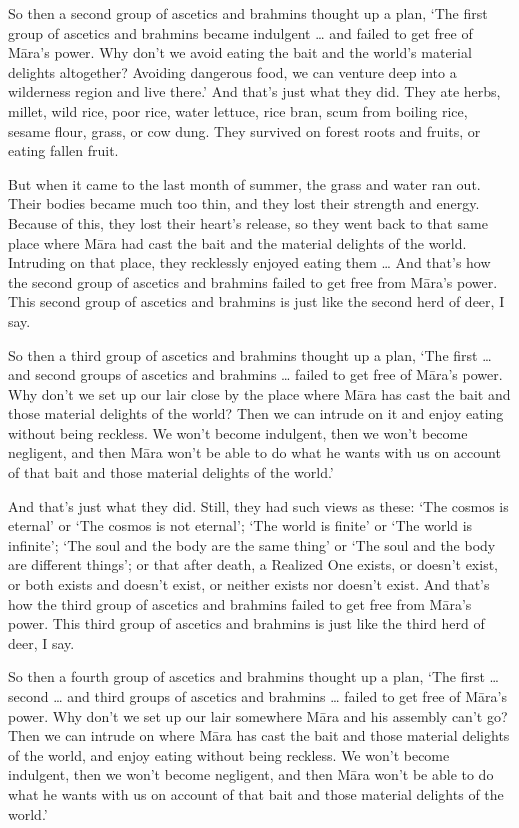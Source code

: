 \documentclass[12pt,openany]{book}%
\begin{document}
So then a second group of ascetics and brahmins thought up a plan, ‘The first group of ascetics and brahmins became indulgent … and failed to get free of \textsanskrit{Māra}’s power. Why don’t we avoid eating the bait and the world’s material delights altogether? Avoiding dangerous food, we can venture deep into a wilderness region and live there.’ And that’s just what they did. They ate herbs, millet, wild rice, poor rice, water lettuce, rice bran, scum from boiling rice, sesame flour, grass, or cow dung. They survived on forest roots and fruits, or eating fallen fruit. 

But when it came to the last month of summer, the grass and water ran out. Their bodies became much too thin, and they lost their strength and energy. Because of this, they lost their heart’s release, so they went back to that same place where \textsanskrit{Māra} had cast the bait and the material delights of the world. Intruding on that place, they recklessly enjoyed eating them … And that’s how the second group of ascetics and brahmins failed to get free from \textsanskrit{Māra}’s power. This second group of ascetics and brahmins is just like the second herd of deer, I say. 

So then a third group of ascetics and brahmins thought up a plan, ‘The first … and second groups of ascetics and brahmins … failed to get free of \textsanskrit{Māra}’s power. Why don’t we set up our lair close by the place where \textsanskrit{Māra} has cast the bait and those material delights of the world? Then we can intrude on it and enjoy eating without being reckless. We won’t become indulgent, then we won’t become negligent, and then \textsanskrit{Māra} won’t be able to do what he wants with us on account of that bait and those material delights of the world.’ 

And that’s just what they did. Still, they had such views as these: ‘The cosmos is eternal’ or ‘The cosmos is not eternal’; ‘The world is finite’ or ‘The world is infinite’; ‘The soul and the body are the same thing’ or ‘The soul and the body are different things’; or that after death, a Realized One exists, or doesn’t exist, or both exists and doesn’t exist, or neither exists nor doesn’t exist. And that’s how the third group of ascetics and brahmins failed to get free from \textsanskrit{Māra}’s power. This third group of ascetics and brahmins is just like the third herd of deer, I say. 

So then a fourth group of ascetics and brahmins thought up a plan, ‘The first … second … and third groups of ascetics and brahmins … failed to get free of \textsanskrit{Māra}’s power. Why don’t we set up our lair somewhere \textsanskrit{Māra} and his assembly can’t go? Then we can intrude on where \textsanskrit{Māra} has cast the bait and those material delights of the world, and enjoy eating without being reckless. We won’t become indulgent, then we won’t become negligent, and then \textsanskrit{Māra} won’t be able to do what he wants with us on account of that bait and those material delights of the world.’ 
\end{document}
